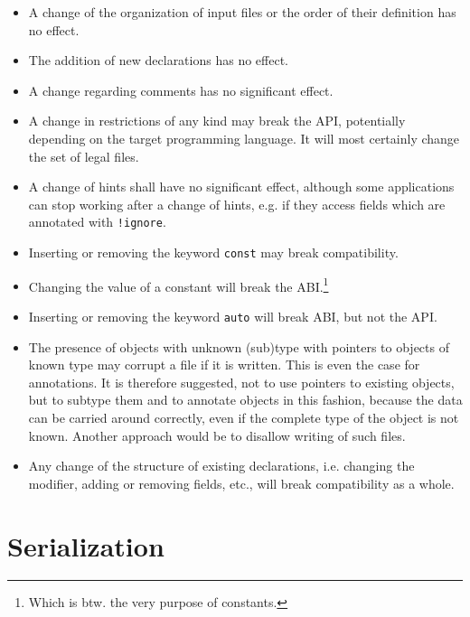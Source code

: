 \documentclass[a4paper,10pt]{article}
\begin{document}
\begin{itemize}
 \item A change of the organization of input files or the order of their definition has no effect.

 \item The addition of new declarations has no effect.

 \item A change regarding comments has no significant effect.

 \item A change in restrictions of any kind may break the API, potentially depending on the target programming language. It will most certainly change the set of legal files.

 \item A change of hints shall have no significant effect, although some applications can stop working after a change of hints, e.g. if they access fields which are annotated with \verb/!ignore/.

 \item Inserting or removing the keyword \texttt{const} may break compatibility.

 \item Changing the value of a constant will break the ABI.\footnote{Which is btw. the very purpose of constants.}

 \item Inserting or removing the keyword \texttt{auto} will break ABI, but not the API.

 \item The presence of objects with unknown (sub)type with pointers to objects of known type may corrupt a file if it is written. This is even the case for annotations. It is therefore suggested, not to use pointers to existing objects, but to subtype them and to annotate objects in this fashion, because the data can be carried around correctly, even if the complete type of the object is not known. Another approach would be to disallow writing of such files.

 \item Any change of the structure of existing declarations, i.e. changing the modifier, adding or removing fields, etc., will break compatibility as a whole.
\end{itemize}

\section{Serialization}
\end{document}
